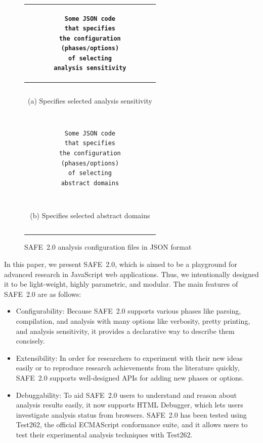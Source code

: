 \documentclass[10pt, conference]{IEEEtran}
\newcommand{\safe}{{SAFE~2.0}\xspace}
\newcommand{\htmldebug}{{\sf\small HTML Debugger}\xspace}
\begin{document}
\setcounter{figure}{0}
\begin{figure}[t]
\centering
\begin{tabular}{|c|}\hline
\begin{minipage}{.3\textwidth}
\footnotesize
\begin{verbatim}
Some JSON code
that specifies
the configuration
(phases/options)
of selecting
analysis sensitivity
\end{verbatim}
\end{minipage}
\\\hline
\multicolumn{1}{c}{~}\\[-.7em]
\multicolumn{1}{c}{\small (a) Specifies selected analysis sensitivity}\\
\multicolumn{1}{c}{~}\\[-.7em]
\hline
\begin{minipage}{.3\textwidth}
\footnotesize
\begin{verbatim}
Some JSON code
that specifies
the configuration
(phases/options)
of selecting
abstract domains
\end{verbatim}
\end{minipage}\\\hline
\multicolumn{1}{c}{~}\\[-.7em]
\multicolumn{1}{c}{\small (b) Specifies selected abstract domains}\\
\multicolumn{1}{c}{~}\\[-.7em]
\end{tabular}
\caption{\small \safe analysis configuration files in JSON format}
\label{fig:configurability}
\end{figure}


In this paper, we present \safe, which is aimed to be a playground
for advanced research in JavaScript web applications.  Thus, we
intentionally designed it to be light-weight, highly parametric,
and modular.  The main features of \safe are as follows:
\begin{itemize}
\item Configurability: Because \safe supports various phases
like parsing, compilation, and analysis with many options like
verbosity, pretty printing, and analysis sensitivity, it provides
a declarative way to describe them concisely.

\item Extensibility: In order for researchers to experiment with their
new ideas easily or to reproduce research achievements from the
literature quickly, \safe supports well-designed APIs for adding new
phases or options.

\item Debuggability: To aid \safe users to understand and reason about
analysis results easily, it now supports \htmldebug, which lets users
investigate analysis status from browsers.  \safe has been tested using
Test262, the official ECMAScript conformance suite, and it allows users
to test their experimental analysis techniques with Test262.
\end{itemize}
\end{document}
